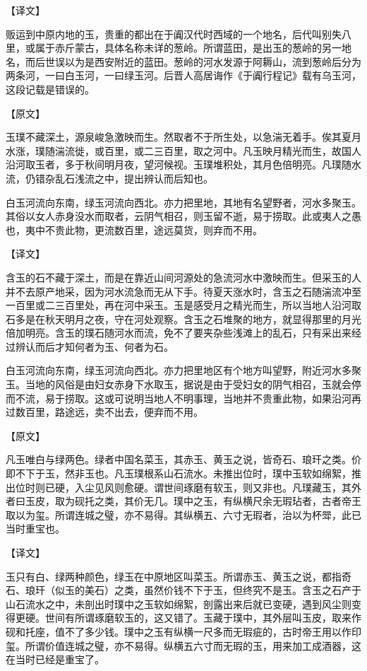 \documentclass[12pt,UTF8]{ctexbook}
\begin{document}
【译文】

贩运到中原内地的玉，贵重的都出在于阗汉代时西域的一个地名，后代叫别失八里，或属于赤斤蒙古，具体名称未详的葱岭。所谓蓝田，是出玉的葱岭的另一地名，而后世误以为是西安附近的蓝田。葱岭的河水发源于阿耨山，流到葱岭后分为两条河，一曰白玉河，一曰绿玉河。后晋人高居诲作《于阗行程记》载有乌玉河，这段记载是错误的。

【原文】

玉璞不藏深土，源泉峻急激映而生。然取者不于所生处，以急湍无着手。俟其夏月水涨，璞随湍流徙，或百里，或二三百里，取之河中。凡玉映月精光而生，故国人沿河取玉者，多于秋间明月夜，望河候视。玉璞堆积处，其月色倍明亮。凡璞随水流，仍错杂乱石浅流之中，提出辨认而后知也。

白玉河流向东南，绿玉河流向西北。亦力把里地，其地有名望野者，河水多聚玉。其俗以女人赤身没水而取者，云阴气相召，则玉留不逝，易于捞取。此或夷人之愚也，夷中不贵此物，更流数百里，途远莫货，则弃而不用。

【译文】

含玉的石不藏于深土，而是在靠近山间河源处的急流河水中激映而生。但采玉的人并不去原产地采，因为河水流急而无从下手。待夏天涨水时，含玉之石随湍流冲至一百里或二三百里处，再在河中采玉。玉是感受月之精光而生，所以当地人沿河取石多是在秋天明月之夜，守在河处观察。含玉之石堆聚的地方，就显得那里的月光倍加明亮。含玉的璞石随河水而流，免不了要夹杂些浅滩上的乱石，只有采出来经过辨认而后才知何者为玉、何者为石。

白玉河流向东南，绿玉河流向西北。亦力把里地区有个地方叫望野，附近河水多聚玉。当地的风俗是由妇女赤身下水取玉，据说是由于受妇女的阴气相召，玉就会停而不流，易于捞取。这或可说明当地人不明事理，当地并不贵重此物，如果沿河再过数百里，路途远，卖不出去，便弃而不用。

【原文】

凡玉唯白与绿两色。绿者中国名菜玉，其赤玉、黄玉之说，皆奇石、琅玕之类。价即不下于玉，然非玉也。凡玉璞根系山石流水。未推出位时，璞中玉软如绵絮，推出位时则已硬，入尘见风则愈硬。谓世间琢磨有软玉，则又非也。凡璞藏玉，其外者曰玉皮，取为砚托之类，其价无几。璞中之玉，有纵横尺余无瑕玷者，古者帝王取以为玺。所谓连城之璧，亦不易得。其纵横五、六寸无瑕者，治以为杯斝，此已当时重宝也。

【译文】

玉只有白、绿两种颜色，绿玉在中原地区叫菜玉。所谓赤玉、黄玉之说，都指奇石、琅玕（似玉的美石）之类，虽然价钱不下于玉，但终究不是玉。含玉之石产于山石流水之中，未剖出时璞中之玉软如绵絮，剖露出来后就已变硬，遇到风尘则变得更硬。世间有所谓琢磨软玉的，这又错了。玉藏于璞中，其外层叫玉皮，取来作砚和托座，值不了多少钱。璞中之玉有纵横一尺多而无瑕疵的，古时帝王用以作印玺。所谓价值连城之璧，亦不易得。纵横五六寸而无瑕的玉，用来加工成酒器，这在当时已经是重宝了。
\end{document}
